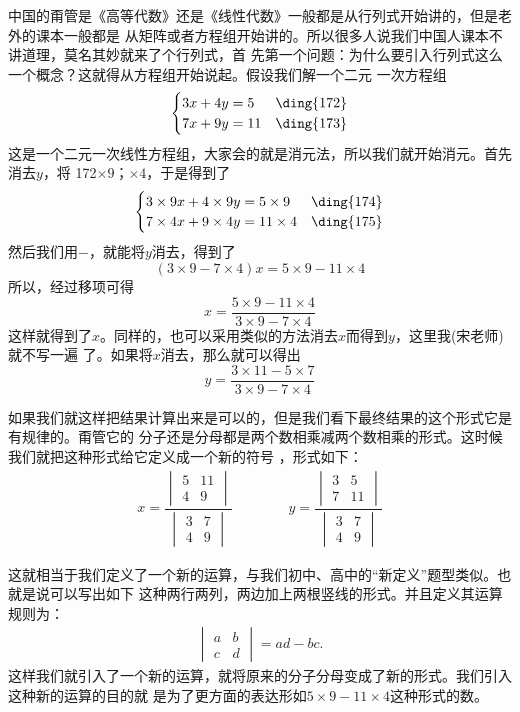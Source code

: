 中国的甭管是《高等代数》还是《线性代数》一般都是从行列式开始讲的，但是老外的课本一般都是
从矩阵或者方程组开始讲的。所以很多人说我们中国人课本不讲道理，莫名其妙就来了个行列式，首
先第一个问题：为什么要引入行列式这么一个概念？这就得从方程组开始说起。假设我们解一个二元
一次方程组
$$\begin{cases}
    3x+4y=5 & \text{\ding{172}}\\
    7x+9y=11 & \text{\ding{173}}
\end{cases}$$
这是一个二元一次线性方程组，大家会的就是消元法，所以我们就开始消元。首先消去$y$，将\ding
{172}$\times 9$；$\times 4$，于是得到了
$$\begin{cases}
    3\times 9x+4\times 9y=5\times 9 & \text{\ding{174}}\\
    7\times 4x+9\times 4y=11\times 4 & \text{\ding{175}}
\end{cases}$$
然后我们用$-$，就能将$y$消去，得到了
\[(3\times 9-7\times 4)x=5\times 9-11\times 4\]
所以，经过移项可得
\[x=\dfrac{5\times 9-11\times 4}{3\times 9-7\times 4}\]
这样就得到了$x$。同样的，也可以采用类似的方法消去$x$而得到$y$，这里我(宋老师)就不写一遍
了。如果将$x$消去，那么就可以得出
\[y=\dfrac{3\times 11-5\times 7}{3\times 9-7\times 4}\]

如果我们就这样把结果计算出来是可以的，但是我们看下最终结果的这个形式它是有规律的。甭管它的
分子还是分母都是两个数相乘减两个数相乘的形式。这时候我们就把这种形式给它定义成一个新的符号
，形式如下：
\begin{align*}
    x=\dfrac{\begin{vmatrix} 5 & 11\\ 4 & 9\end{vmatrix}}
            {\begin{vmatrix} 3 & 7\\ 4 & 9\end{vmatrix}} \qquad\qquad
    y=\dfrac{\begin{vmatrix} 3 & 5\\ 7 & 11\end{vmatrix}}
            {\begin{vmatrix} 3 & 7\\ 4 & 9\end{vmatrix}}
\end{align*}

这就相当于我们定义了一个新的运算，与我们初中、高中的“新定义”题型类似。也就是说可以写出如下
这种两行两列，两边加上两根竖线的形式。并且定义其运算规则为：
\begin{align*}
    \begin{vmatrix}
        a & b \\
        c & d
    \end{vmatrix}=ad-bc.
\end{align*}
这样我们就引入了一个新的运算，就将原来的分子分母变成了新的形式。我们引入这种新的运算的目的就
是为了更方面的表达形如$5\times 9-11\times 4$这种形式的数。

